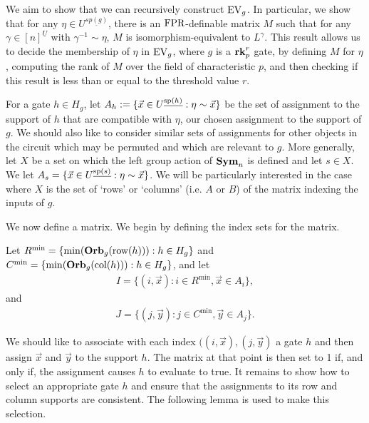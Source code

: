 \documentclass[../paper.tex]{subfiles}
\begin{document}
We aim to show that we can recursively construct $\text{EV}_g$. In particular, we show
that for any $\eta \in U^{\underline{sp(g)}}$, there is an $\text{\upshape FPR}$-definable
matrix $M$ such that for any $\gamma \in [n]^{\underline{U}}$ with $\gamma^{-1}
\sim \eta$, $M$ is isomorphism-equivalent to $L^{\gamma}$. This result allows us
to decide the membership of $\eta$ in $\text{EV}_g$, where $g$ is a $\text{\textbf{rk}}^r_p$ gate,
by defining $M$ for $\eta$, computing the rank of $M$ over the field of
characteristic $p$, and then checking if this result is less than or equal to
the threshold value $r$.

For a gate $h \in H_g$, let $A_h := \{\vec{x} \in U^{\underline{\text{sp}(h)}} :
\eta \sim \vec{x}\}$ be the set of assignment to the support of $h$ that are
compatible with $\eta$, our chosen assignment to the support of $g$. We should
also like to consider similar sets of assignments for other objects in the
circuit which may be permuted and which are relevant to $g$. More generally, let
$X$ be a set on which the left group action of $\text{\textbf{Sym}}_n$ is defined and let $s
\in X$. We let $A_s = \{\vec{x} \in U^{\underline{\text{sp}(s)}} : \eta \sim
\vec{x}\}$. We will be particularly interested in the case where $X$ is the set
of `rows' or `columns' (i.e. $A$ or $B$) of the matrix indexing the inputs of
$g$.


We now define a matrix. We begin by defining the index sets for the matrix.

Let $R^{\min} = \{\min (\text{\textbf{Orb}}_g(\text{row}(h))) : h \in H_g\}$ and $C^{\min} = \{ \min
(\text{\textbf{Orb}}_g (\text{col}(h))) : h \in H_g\}$, and let
\begin{align*}
	I = \{(i, \vec{x}): i \in R^{\min}, \vec{x} \in A_i\}, 
\end{align*}
and
\begin{align*}
	J = \{(j, \vec{y}): j \in C^{\min}, \vec{y} \in A_j\}. 
\end{align*}

We should like to associate with each index $((i, \vec{x}), (j, \vec{y})$ a gate
$h$ and then assign $\vec{x}$ and $\vec{y}$ to the support $h$. The matrix at
that point is then set to 1 if, and only if, the assignment causes $h$ to
evaluate to true. It remains to show how to select an appropriate gate $h$ and
ensure that the assignments to its row and column supports are consistent. The
following lemma is used to make this selection.
\end{document}
